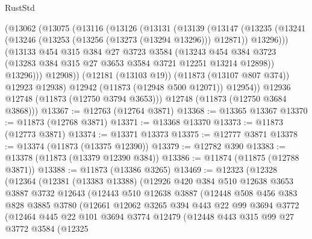 \begin{lexlean}{RustStd}
\begin{coremodule}
          (@13062
            (@13075
              (@13116
                (@13126
                  (@13131
                    (@13139
                      (@13147
                        (@13235
                          (@13241
                            (@13246 (@13253 (@13256 (@13273 (@13294 @13296))) @12871))
                            @13296)))
                      (@13133
                        @454
                        @315
                        @384
                        @27
                        @3723
                        @3584
                        (@13243
                          @454
                          @384
                          @3723
                          (@13283 @384 @315 @27 @3653 @3584 @3721 @12251 @13214 @12898))
                        @13296)))
                  @12908))
              (@12181 (@13103 @19))
              (@11873 (@13107 @807 @374))
              @12923
              @12938)
            @12942
            (@11873 (@12948 @500 @12071))
            @12954))
        @12936
        @12748
        (@11873 (@12750 @3794 @3653)))
      @12748
      (@11873 (@12750 @3684 @3868)))
@13367 := @12763 (@12764 @3871)
@13368 := @13365 @13367
@13370 := @11873 (@12768 @3871)
@13371 := @13368 @13370
@13373 := @11873 (@12773 @3871)
@13374 := @13371 @13373
@13375 := @12777 @3871
@13378 := @13374 (@11873 (@13375 @12390))
@13379 := @12782 @390
@13383 := @13378 (@11873 (@13379 @12390 @384))
@13386 := @11874 (@11875 (@12788 @3871))
@13388 := @11873 (@13386 @3265)
@13469 := @12323
    (@12328
      (@12364
        (@12381
          (@13383 @13388)
          (@12926
            @420
            @384
            @510
            @12638
            @3653
            @3887
            @3732
            @12643
            (@12443
              @510
              @12638
              @3887
              (@12448
                @508
                @456
                @383
                @828
                @3885
                @3780
                (@12661
                  @12062
                  @3265
                  @394
                  @443
                  @22
                  @99
                  @3694
                  @3772
                  (@12464
                    @445
                    @22
                    @101
                    @3694
                    @3774
                    @12479
                    (@12448
                      @443
                      @315
                      @99
                      @27
                      @3772
                      @3584
                      (@12325

\end{coremodule}
\end{lexlean}
